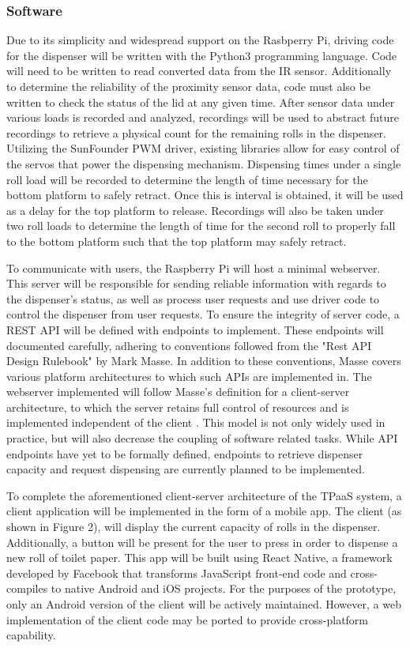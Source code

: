 \subsubsection{Software}
\par Due to its simplicity and widespread support on the Rasbperry Pi, driving code for the dispenser will be written with the Python3 programming language. Code will need to be written to read converted data from the IR sensor. Additionally to determine the reliability of the proximity sensor data, code must also be written to check the status of the lid at any given time. After sensor data under various loads is recorded and analyzed, recordings will be used to abstract future recordings to retrieve a physical count for the remaining rolls in the dispenser. Utilizing the SunFounder PWM driver, existing libraries allow for easy control of the servos that power the dispensing mechanism. Dispensing times under a single roll load will be recorded to determine the length of time necessary for the bottom platform to safely retract. Once this is interval is obtained, it will be used as a delay for the top platform to release. Recordings will also be taken under two roll loads to determine the length of time for the second roll to properly fall to the bottom platform such that the top platform may safely retract.

\par To communicate with users, the Raspberry Pi will host a minimal webserver. This server will be responsible for sending reliable information with regards to the dispenser's status, as well as process user requests and use driver code to control the dispenser from user requests. To ensure the integrity of server code, a REST API will be defined with endpoints to implement. These endpoints will documented carefully, adhering to conventions followed from the "Rest API Design Rulebook" by Mark Masse. In addition to these conventions, Masse covers various platform architectures to which such APIs are implemented in. The webserver implemented will follow Masse's definition for a client-server architecture, to which the server retains full control of resources and is implemented independent of the client \cite{rest_api_rulebook}. This model is not only widely used in practice, but will also decrease the coupling of software related tasks. While API endpoints have yet to be formally defined, endpoints to retrieve dispenser capacity and request dispensing are currently planned to be implemented.

\par To complete the aforementioned client-server architecture of the TPaaS system, a client application will be implemented in the form of a mobile app. The client (as shown in Figure 2), will display the current capacity of rolls in the dispenser. Additionally, a button will be present for the user to press in order to dispense a new roll of toilet paper. This app will be built using React Native, a framework developed by Facebook that transforms JavaScript front-end code and cross-compiles to native Android and iOS projects. For the purposes of the prototype, only an Android version of the client will be actively maintained. However, a web implementation of the client code may be ported to provide cross-platform capability.

